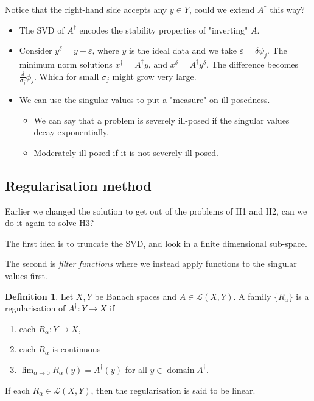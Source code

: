 \documentclass[12pt]{article}
\theoremstyle{definition}
\newtheorem{definition}{Definition}[section]
\newcommand{\eps}{\varepsilon}    %
\DeclareMathOperator{\domain}{domain}
\begin{document}
Notice that the right-hand side accepts any $y\in Y$, could we extend $A^\dagger $ this way?
\begin{itemize}
    \item The SVD of $A^\dagger $ encodes the stability properties of "inverting" $A$.
    \item Consider $y^\delta = y +\eps$, where $y$ is the ideal data and we take $\eps = \delta \psi_j$. The minimum norm solutions $x^\dagger  = A^\dagger y$, and $x^\delta = A^\dagger y^\delta$. The difference becomes $\frac{\delta}{\sigma_j}\phi_j$. Which for small $\sigma_j$ might grow very large.
    \item We can use the singular values to put a "measure" on ill-posedness.
    \begin{itemize}
        \item We can say that a problem is severely ill-posed if the singular values decay exponentially.
        \item Moderately ill-posed if it is not severely ill-posed.
    \end{itemize}
\end{itemize}

\subsection{Regularisation method}
Earlier we changed the solution to get out of the problems of H1 and H2, can we do it again to solve H3?

The first idea is to truncate the SVD, and look in a finite dimensional sub-space.

The second is \textit{filter functions} where we instead apply functions to the singular values first.

\begin{definition}
    Let $X, Y$ be Banach spaces and $A\in \mathcal{L}(X,Y)$. A family $\{R_\alpha\}$ is a regularisation of $A^\dagger :Y\to X$ if 
    \begin{enumerate}[label=(\alph*)]
        \item each $R_\alpha:Y\to X$,
        \item each $R_\alpha$ is continuous
        \item $\lim_{\alpha\to 0} R_\alpha(y) = A^\dagger (y)$ for all $y\in \domain A^\dagger $.
    \end{enumerate}
    If each $R_\alpha\in\mathcal{L}(X,Y)$, then the regularisation is said to be linear.
\end{definition}
\end{document}
